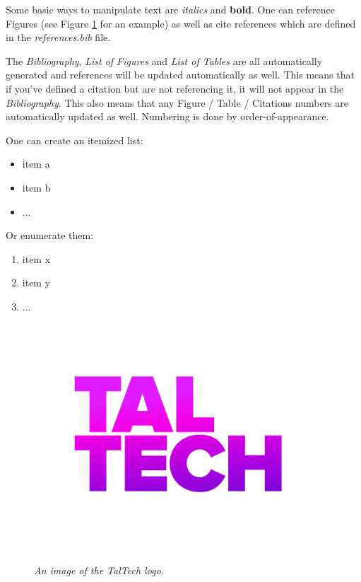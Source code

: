 Some basic ways to manipulate text are \textit{italics} and \textbf{bold}. One can reference Figures (see Figure \ref{fig:taltech} for an example) as well as cite references which are defined in the \textit{references.bib} file.\cite{spectre,example-reference}

The \textit{Bibliography}, \textit{List of Figures} and \textit{List of Tables} are all automatically generated and references will be updated automatically as well. This means that if you've defined a citation but are not referencing it, it will not appear in the \textit{Bibliography}. This also means that any Figure / Table / Citations numbers are automatically updated as well. Numbering is done by order-of-appearance.

One can create an itemized list:
\begin{itemize}
    \item item a
    \item item b
    \item ...
\end{itemize}

Or enumerate them:
\begin{enumerate}
    \item item x
    \item item y
    \item ...
\end{enumerate}


\begin{figure}[ht]
    \centering
    \includegraphics[width=.5\textwidth]{figures/taltech.jpg}
    \caption{\textit{An image of the TalTech logo.}}
    \label{fig:taltech}
\end{figure}


